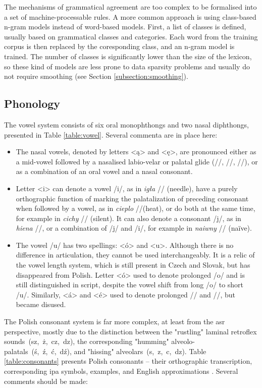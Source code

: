 The mechanisms of grammatical agreement are too complex to be formalised into a set of machine-processable rules. A more common approach is using class-based n-gram models instead of word-based models. First, a list of classes is defined, usually based on grammatical classes and categories. Each word from the training corpus is then replaced by the coresponding class, and an n-gram model is trained. The number of classes is significantly lower than the size of the lexicon, so these kind of models are less prone to data sparsity problems and usually do not require smoothing (see Section \ref{subsection:smoothing}).

\subsection{Phonology}
The vowel system consists of six oral monophthongs and two nasal diphthongs, presented in Table \ref{table:vowel}. Several commenta are in place here:
\begin{itemize}
\item The nasal vowels, denoted by letters <ą> and <ę>, are pronounced either as a mid-vowel followed by a nasalised labio-velar or palatal glide (//, //, //), or as a combination of an oral vowel and a nasal consonant.
\item Letter <i> can denote a vowel /i/, as in \textit{igła} // (needle), have a purely orthographic function of marking the palatalization of preceding consonant when followed by a vowel, as in \textit{cieplo} //(heat), or do both at the same time, for example in \textit{cichy} // (silent). It can also denote a consonant /j/, as in \textit{hiena} //, or a combination of /j/ and /i/, for example in \textit{naiwny} // (naïve).
\item The vowel /u/ has two spellings: <ó> and <u>. Although there is no difference in articulation, they cannot be used interchangeably. It is a relic of the vowel length system, which is still present in Czech and Slovak, but has disappeared from Polish. Letter <ó> used to denote prolonged /o/ and is still distinguished in script, despite the vowel shift from long /o/ to short /u/. Similarly, <á> and <é> used to denote prolonged // and //, but became disused.
\end{itemize}

The Polish consonant system is far more complex, at least from the \gls{asr} perspective, mostly due to the distinction between the "rustling" laminal retroflex sounds~(sz,~ż,~cz,~dz), the corresponding "humming" alveolo-palatals~(ś,~ź,~ć,~dź), and "hissing" alveolars~(s,~z,~c,~dz). Table \ref{table:consonants} presents Polish consonants -- their orthographic transcription, corresponding \gls{ipa} symbols, examples, and English approximations \cite{gussmann2007phonology}. Several comments should be made:

